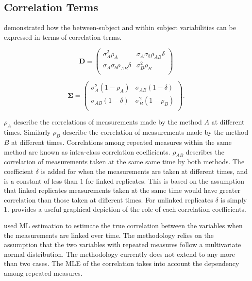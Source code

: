 \documentclass[12pt, a4paper]{report}
\theoremstyle{plain}
\theoremstyle{definition}
\theoremstyle{remark}
\begin{document}
			
			\subsection{Correlation Terms}
			
			\citet{hamlett} demonstrated how the between-subject and within subject variabilities can be expressed in terms of
			correlation terms.
			
			\[
			\boldsymbol{D} = \left( \begin{array}{cc}
			\sigma^2_{A}\rho_{A} & \sigma_{A}\sigma_{b}\rho_{AB}\delta \\
			\sigma_{A}\sigma_{b}\rho_{AB}\delta & \sigma^2_{B}\rho_{B}\\
			
			\end{array}\right)
			\]
			
			\[
			\boldsymbol{\Sigma} = \left(
			\begin{array}{cc}
			\sigma^2_{A}(1-\rho_{A}) & \sigma_{AB}(1-\delta)  \\
			\sigma_{AB}(1-\delta) & \sigma^2_{B}(1-\rho_{B}) \\
			\end{array}\right).
			\]
			
			$\rho_{A}$ describe the correlations of measurements made by the method $A$ at different times. Similarly $\rho_{B}$ describe the correlation of measurements made by the method $B$ at different times. Correlations among repeated measures within the same method are known as intra-class correlation coefficients. $\rho_{AB}$ describes the correlation of measurements taken at the same same time by both methods. The coefficient $\delta$ is added for when the measurements are taken at different times, and is a constant of less than $1$ for linked replicates. This is based on the assumption that linked replicates measurements taken at the same time would have greater correlation than those taken at different times. For unlinked replicates $\delta$ is simply $1$. \citet{hamlett} provides a useful graphical depiction of the role of each correlation coefficients.
			
			\citet{lam} used ML estimation to estimate the true correlation between the variables when the measurements are linked over time. The methodology relies on the assumption that the two variables with repeated measures follow a multivariate normal distribution. The methodology currently does not extend to any more than two cases. The MLE of the correlation takes into account the dependency among repeated measures.
			
\end{document}
